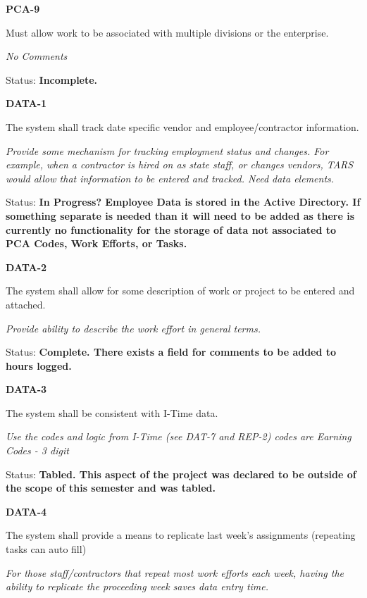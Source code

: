 \documentclass{article}
\begin{document}
\noindent \textbf{PCA-9}

\noindent Must allow work to be associated with multiple divisions or the enterprise.

\textit{No Comments}

 Status: \textbf{Incomplete.}

\noindent 

\noindent \textbf{DATA-1}

\noindent The system shall track date specific vendor and employee/contractor information.

\noindent \textit{Provide some mechanism for tracking employment status and changes. For example, when a contractor is hired on as state staff, or changes vendors, TARS would allow that information to be entered and tracked. Need data elements.}

\noindent Status: \textbf{In Progress?  Employee Data is stored in the Active Directory.  If something separate is needed than it will need to be added as there is currently no functionality for the storage of data not associated to PCA Codes, Work Efforts, or Tasks.}\textit{}

\noindent \textit{}

\noindent \textbf{DATA-2}

\noindent The system shall allow for some description of work or project to be entered and attached.

\textit{Provide ability to describe the work effort in general terms.}

Status: \textbf{Complete.  There exists a field for comments to be added to hours logged.}\textit{}

\noindent 

\noindent \textbf{DATA-3}

\noindent The system shall be consistent with I-Time data.

\textit{Use the codes and logic from I-Time (see DAT-7 and REP-2) codes are Earning Codes - 3 digit}

\noindent Status: \textbf{Tabled.  This aspect of the project was declared to be outside of the scope of this semester and was tabled.}\textit{}

\noindent 

\noindent \textbf{DATA-4}

\noindent The system shall provide a means to replicate last week's assignments (repeating tasks can auto fill)

\noindent \textit{For those staff/contractors that repeat most work efforts each week, having the ability to replicate the proceeding week saves data entry time.}
\end{document}
